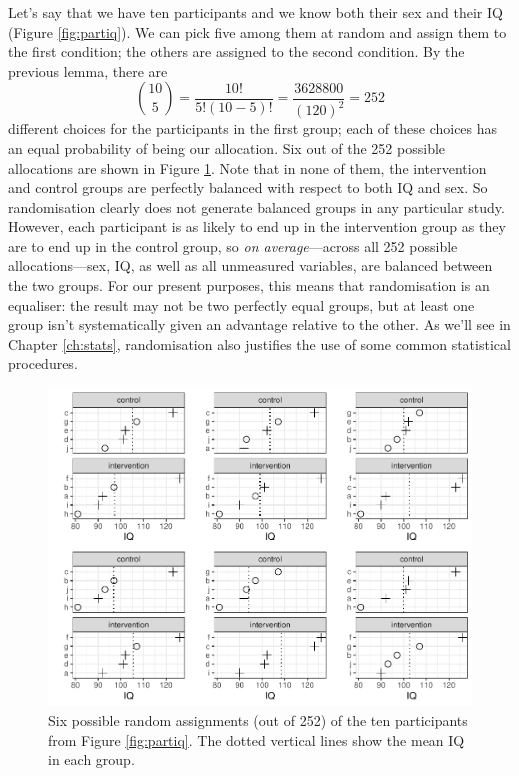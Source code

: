 \documentclass[a4paper]{tufte-book}\usepackage[]{graphicx}\usepackage[]{xcolor}
\begin{document}
Let's say that we have ten participants
and we know both their sex and their IQ (Figure \vref{fig:partiq}).
We can pick five among them at random and assign them to the first condition;
the others are assigned to the second condition.
By the previous lemma, there are
\[
  {10 \choose 5} = \frac{10!}{5!(10-5)!} = \frac{3628800}{(120)^2} = 252
\]
different choices for the participants in the first group;
each of these choices has an equal probability of being our allocation.
Six out of the 252 possible allocations are shown in Figure \ref{fig:rand-alloc}.
Note that in none of them, the intervention and control groups are
perfectly balanced with respect to both IQ and sex.
So randomisation clearly does not generate balanced groups in any particular
study. However, each participant is as likely to end up in the intervention
group as they are to end up in the control group, so \emph{on average}---across
all 252 possible allocations---sex, IQ, as well as all unmeasured variables,
are balanced between the two groups. For our present purposes, this means that
randomisation is an equaliser: the result may not be two perfectly equal groups,
but at least one group isn't systematically given an advantage relative to the other.
As we'll see in Chapter \ref{ch:stats}, randomisation also justifies the use of some
common statistical procedures.



\begin{figure}[tpbh]
  \centering
  \includegraphics[max width = \textwidth]{figure/rand-alloc-1}
  \caption{Six possible random assignments (out of 252) of the ten participants from Figure \ref{fig:partiq}. The dotted vertical lines show the mean IQ in each group.}
  \label{fig:rand-alloc}
\end{figure}
\end{document}
